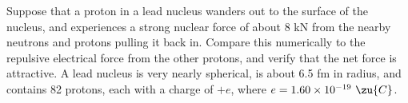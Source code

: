         Suppose that a proton in a lead nucleus wanders out to
        the surface of the nucleus, and experiences a strong nuclear
        force of about 8 kN from the nearby neutrons and protons
        pulling it back in.  Compare this numerically to the
        repulsive electrical force from the other protons, and
        verify that the net force is attractive.  A lead nucleus is
        very nearly spherical, 
        is about 6.5 fm in radius, and
        contains 82 protons, each with a charge of $+e$, where
        $e=1.60\times10^{-19}\ \zu{C}$.
\answercheck
